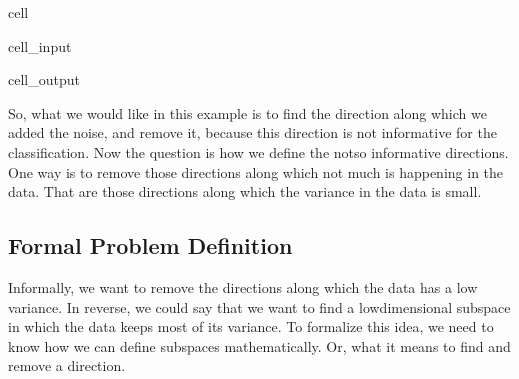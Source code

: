 \documentclass[letterpaper,10pt,english]{jupyterBook}
\begin{document}
\begin{sphinxuseclass}{cell}\begin{sphinxVerbatimInput}

\begin{sphinxuseclass}{cell_input}
\begin{sphinxVerbatim}[commandchars=\\\{\}]
     
                 
\end{sphinxVerbatim}

\end{sphinxuseclass}\end{sphinxVerbatimInput}
\begin{sphinxVerbatimOutput}

\begin{sphinxuseclass}{cell_output}
\noindent{}

\end{sphinxuseclass}\end{sphinxVerbatimOutput}

\end{sphinxuseclass}
\sphinxAtStartPar
So, what we would like in this example is to find the direction along which we added the noise, and remove it, because this direction is not informative for the classification. Now the question is how we define the not\sphinxhyphen{}so informative directions. One way is to remove those directions along which not much is happening in the data. That are those directions along which the variance in the data is small.


\subsection{Formal Problem Definition}
\label{\detokenize{dim_reduction_pca:formal-problem-definition}}
\sphinxAtStartPar
Informally, we want to remove the directions along which the data has a low variance. In reverse, we could say that we want to find a low\sphinxhyphen{}dimensional subspace in which the data keeps most of its variance. To formalize this idea, we need to know how we can define subspaces mathematically. Or, what it means to find and remove a direction.
\end{document}
